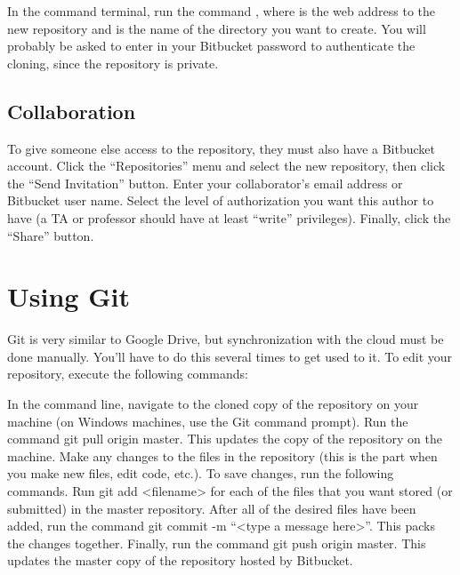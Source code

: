 In the command terminal, run the command
, where  is the web address to the new repository and  is the name of the directory you want to create.
You will probably be asked to enter in your Bitbucket password to authenticate the cloning, since the repository is private.
% 

\subsection*{Collaboration} %

To give someone else access to the repository, they must also have a Bitbucket account.
Click the ``Repositories'' menu and select the new repository, then click the ``Send Invitation'' button.
Enter your collaborator's email address or Bitbucket user name. %
Select the level of authorization you want this author to have (a TA or professor should have at least ``write'' privileges).
Finally, click the ``Share'' button.

\section*{Using Git} %

Git is very similar to Google Drive, but synchronization with the cloud must be done manually. You'll have to do this several times to get used to it. To edit your repository, execute the following commands:

In the command line, navigate to the cloned copy of the repository on your machine (on Windows machines, use the Git command prompt).
Run the command git pull origin master. This updates the copy of the repository on the machine.
Make any changes to the files in the repository (this is the part when you make new files, edit code, etc.).
To save changes, run the following commands.
Run git add <filename> for each of the files that you want stored (or submitted) in the master repository.
After all of the desired files have been added, run the command git commit -m ``<type a message here>''. This packs the changes together.
Finally, run the command git push origin master. This updates the master copy of the repository hosted by Bitbucket.

